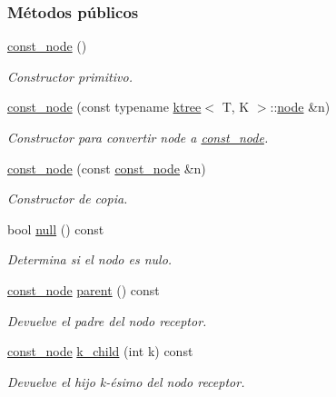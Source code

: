 \subsubsection*{Métodos públicos}
\begin{DoxyCompactItemize}
\item 
\hyperlink{classktree_1_1const__node_a439b384a406a9f05c9521d1fab3f4df7}{const\+\_\+node} ()
\begin{DoxyCompactList}\small\item\em Constructor primitivo. \end{DoxyCompactList}\item 
\hyperlink{classktree_1_1const__node_a756dc440f0c7589bbb79dccbd2986317}{const\+\_\+node} (const typename \hyperlink{classktree}{ktree}$<$ T, K $>$\+::\hyperlink{classktree_1_1node}{node} \&n)
\begin{DoxyCompactList}\small\item\em Constructor para convertir node a \hyperlink{classktree_1_1const__node}{const\+\_\+node}. \end{DoxyCompactList}\item 
\hyperlink{classktree_1_1const__node_a87694d10de1d723974a1f7e51b51c788}{const\+\_\+node} (const \hyperlink{classktree_1_1const__node}{const\+\_\+node} \&n)
\begin{DoxyCompactList}\small\item\em Constructor de copia. \end{DoxyCompactList}\item 
bool \hyperlink{classktree_1_1const__node_a2a5d20cd6c40daea30e006490dafbd8a}{null} () const 
\begin{DoxyCompactList}\small\item\em Determina si el nodo es nulo. \end{DoxyCompactList}\item 
\hyperlink{classktree_1_1const__node}{const\+\_\+node} \hyperlink{classktree_1_1const__node_a0ead125a85ccf4ddecb46bea325fad68}{parent} () const 
\begin{DoxyCompactList}\small\item\em Devuelve el padre del nodo receptor. \end{DoxyCompactList}\item 
\hyperlink{classktree_1_1const__node}{const\+\_\+node} \hyperlink{classktree_1_1const__node_ac853df3589c77a18836ddd4a9741b789}{k\+\_\+child} (int k) const 
\begin{DoxyCompactList}\small\item\em Devuelve el hijo k-\/ésimo del nodo receptor. \end{DoxyCompactList}\item 

\end{DoxyCompactItemize}
